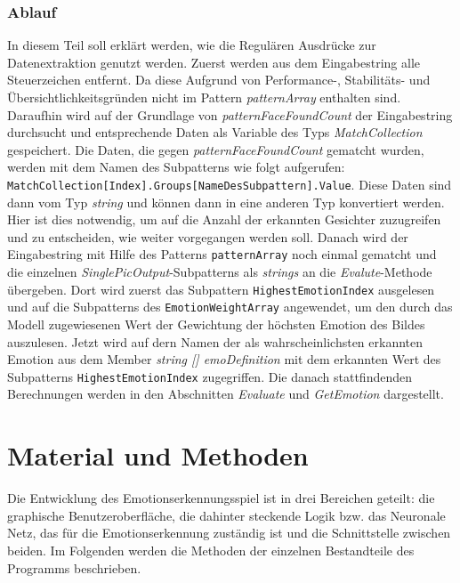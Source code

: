 \documentclass[10pt,a4paper]{report}
\begin{document}
\subsection{Ablauf}
In diesem Teil soll erklärt werden, wie die Regulären Ausdrücke zur Datenextraktion genutzt werden. Zuerst werden aus dem Eingabestring alle Steuerzeichen entfernt. Da diese Aufgrund
 von Performance-, Stabilitäts- und Übersichtlichkeitsgründen nicht im Pattern \textit{patternArray} enthalten sind. Daraufhin wird auf der Grundlage von \textit{patternFaceFoundCount}
 der Eingabestring durchsucht und entsprechende Daten als Variable des Typs \textit{MatchCollection} gespeichert. Die Daten, die gegen \textit{patternFaceFoundCount} gematcht wurden, werden mit dem Namen
 des Subpatterns wie folgt aufgerufen: \texttt{MatchCollection[Index].Groups[NameDesSubpattern].Value}. Diese Daten sind dann vom Typ \textit{string} und können dann in eine anderen Typ konvertiert werden. Hier ist dies notwendig, um auf die Anzahl der erkannten Gesichter zuzugreifen und zu entscheiden, wie weiter vorgegangen werden soll.
 Danach wird der Eingabestring mit Hilfe des Patterns \texttt{patternArray} noch einmal gematcht und die einzelnen \textit{SinglePicOutput}-Subpatterns als \textit{strings} an die \textit{Evalute}-Methode übergeben. Dort wird zuerst das Subpattern \texttt{HighestEmotionIndex} ausgelesen und auf die Subpatterns des \texttt{EmotionWeightArray} angewendet, um den durch das Modell zugewiesenen Wert der Gewichtung der höchsten Emotion des Bildes auszulesen. Jetzt wird auf dern Namen der als wahrscheinlichsten erkannten Emotion aus dem Member \textit{string [] emoDefinition} mit dem erkannten Wert des Subpatterns \texttt{HighestEmotionIndex} zugegriffen. Die danach stattfindenden Berechnungen werden in den Abschnitten \textit{Evaluate} und \textit{GetEmotion} dargestellt. 

\chapter{Material und Methoden}
Die Entwicklung des Emotionserkennungsspiel ist in drei Bereichen geteilt:
die graphische Benutzeroberfläche, die dahinter steckende Logik bzw. das
Neuronale Netz, das für die Emotionserkennung zuständig ist und die Schnittstelle
zwischen beiden. Im Folgenden werden die Methoden der einzelnen Bestandteile
des Programms beschrieben. 
\end{document}
